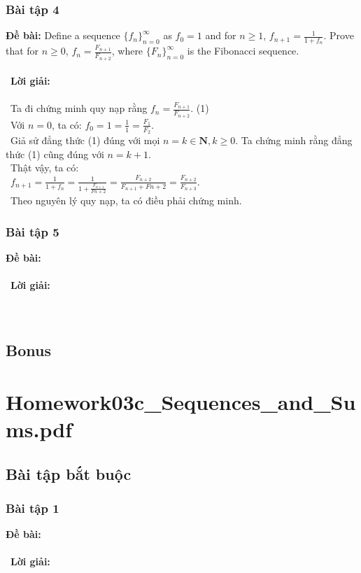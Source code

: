 \documentclass[a4paper]{article}
\begin{document}
\begin{enumerate}
\subsubsection{Bài tập 4}
\textbf{Đề bài: }Define a sequence $\{f_n\}_{n=0}^\infty$ as $f_0 = 1$ and for $n \geq 1$, $f_{n+1} = \frac{1}{1+f_n}$. Prove that for $n \geq 0$, $f_n = \frac{F_{n+1}}{F_{n+2}}$, where $\{F_n\}_{n=0}^\infty$ is the Fibonacci sequence. \\\ \\\
\textbf{Lời giải: } \\\ \\\
Ta đi chứng minh quy nạp rằng $f_n = \frac{F_{n+1}}{F_{n+2}}$. (1)\\\
Với $n = 0$, ta có: $f_0 = 1 = \frac{1}{1} = \frac{F_1}{F_2}$. \\\
Giả sử đẳng thức (1) đúng với mọi $n = k \in \textbf{N}, k \geq 0$.
Ta chứng minh rằng đẳng thức (1) cũng đúng với $n = k+1$.\\\
Thật vậy, ta có: \\\
$f_{n+1} = \frac{1}{1+f_n} = \frac{1}{1+\frac{F_{n+1}}{F{n+2}}} = \frac{F_{n+2}}{F_{n+1} + F{n+2}} = \frac{F_{n+2}}{F_{n+3}}$. \\\
Theo nguyên lý quy nạp, ta có điều phải chứng minh.
\clearpage
\subsubsection{Bài tập 5}
\textbf{Đề bài:} 
\\\ \\\
\textbf{Lời giải:} \\\ \\\
\clearpage

\subsection{Bonus}
\clearpage

\section{Homework03c\_Sequences\_and\_Sums.pdf}
\subsection{Bài tập bắt buộc}
\subsubsection{Bài tập 1}
\textbf{Đề bài:} 
\\\ \\\
\textbf{Lời giải:} \\\ \\\
\clearpage

\end{enumerate}
\end{document}
